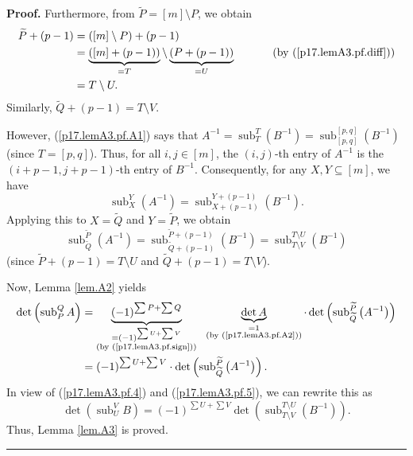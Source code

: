 \documentclass[numbers=enddot,12pt,final,onecolumn,notitlepage]{scrartcl}%
\theoremstyle{definition}
\newenvironment{proof}[1][Proof]{\noindent\textbf{#1.} }{\ \rule{0.5em}{0.5em}}
\let\sumnonlimits\sum
\renewcommand{\sum}{\sumnonlimits\limits}
\begin{document}
\begin{enumerate}
\begin{proof}
Furthermore, from $\widetilde{P}=\left[  m\right]  \setminus P$, we obtain
\begin{align*}
\widetilde{P}+\left(  p-1\right)   &  =\left(  \left[  m\right]  \setminus
P\right)  +\left(  p-1\right) \\
&  =\underbrace{\left(  \left[  m\right]  +\left(  p-1\right)  \right)  }%
_{=T}\setminus\underbrace{\left(  P+\left(  p-1\right)  \right)  }%
_{=U}\ \ \ \ \ \ \ \ \ \ \left(  \text{by (\ref{p17.lemA3.pf.diff})}\right) \\
&  =T\setminus U.
\end{align*}
Similarly, $\widetilde{Q}+\left(  p-1\right)  =T\setminus V$.

However, (\ref{p17.lemA3.pf.A1}) says that $A^{-1}=\operatorname*{sub}%
\nolimits_{T}^{T}\left(  B^{-1}\right)  =\operatorname*{sub}\nolimits_{\left[
p,q\right]  }^{\left[  p,q\right]  }\left(  B^{-1}\right)  $ (since $T=\left[
p,q\right]  $). Thus, for all $i,j\in\left[  m\right]  $, the $\left(
i,j\right)  $-th entry of $A^{-1}$ is the $\left(  i+p-1,j+p-1\right)  $-th
entry of $B^{-1}$. Consequently, for any $X,Y\subseteq\left[  m\right]  $, we
have%
\[
\operatorname*{sub}\nolimits_{X}^{Y}\left(  A^{-1}\right)
=\operatorname*{sub}\nolimits_{X+\left(  p-1\right)  }^{Y+\left(  p-1\right)
}\left(  B^{-1}\right)  .
\]
Applying this to $X=\widetilde{Q}$ and $Y=\widetilde{P}$, we obtain%
\begin{equation}
\operatorname*{sub}\nolimits_{\widetilde{Q}}^{\widetilde{P}}\left(
A^{-1}\right)  =\operatorname*{sub}\nolimits_{\widetilde{Q}+\left(
p-1\right)  }^{\widetilde{P}+\left(  p-1\right)  }\left(  B^{-1}\right)
=\operatorname*{sub}\nolimits_{T\setminus V}^{T\setminus U}\left(
B^{-1}\right)  \label{p17.lemA3.pf.5}%
\end{equation}
(since $\widetilde{P}+\left(  p-1\right)  =T\setminus U$ and $\widetilde{Q}%
+\left(  p-1\right)  =T\setminus V$).

Now, Lemma \ref{lem.A2} yields%
\begin{align*}
\det\left(  \operatorname*{sub}\nolimits_{P}^{Q}A\right)   &
=\underbrace{\left(  -1\right)  ^{\sum P+\sum Q}}_{\substack{=\left(
-1\right)  ^{\sum U+\sum V}\\\text{(by (\ref{p17.lemA3.pf.sign}))}%
}}\ \ \underbrace{\det A}_{\substack{=1\\\text{(by (\ref{p17.lemA3.pf.A2}))}%
}}\cdot\det\left(  \operatorname*{sub}\nolimits_{\widetilde{Q}}^{\widetilde{P}%
}\left(  A^{-1}\right)  \right) \\
&  =\left(  -1\right)  ^{\sum U+\sum V}\cdot\det\left(  \operatorname*{sub}%
\nolimits_{\widetilde{Q}}^{\widetilde{P}}\left(  A^{-1}\right)  \right)  .
\end{align*}
In view of (\ref{p17.lemA3.pf.4}) and (\ref{p17.lemA3.pf.5}), we can rewrite
this as%
\[
\det\left(  \operatorname*{sub}\nolimits_{U}^{V}B\right)  =\left(  -1\right)
^{\sum U+\sum V}\det\left(  \operatorname*{sub}\nolimits_{T\setminus
V}^{T\setminus U}\left(  B^{-1}\right)  \right)  .
\]
Thus, Lemma \ref{lem.A3} is proved.
\end{proof}


\end{enumerate}
\end{document}
